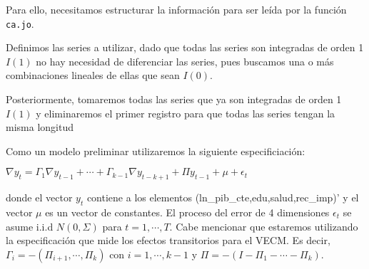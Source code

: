 \documentclass[]{book}
\newenvironment{Shaded}{\begin{snugshade}}{\end{snugshade}}
\newcommand{\KeywordTok}[1]{\textcolor[rgb]{0.13,0.29,0.53}{\textbf{#1}}}
\newcommand{\StringTok}[1]{\textcolor[rgb]{0.31,0.60,0.02}{#1}}
\newcommand{\CommentTok}[1]{\textcolor[rgb]{0.56,0.35,0.01}{\textit{#1}}}
\newcommand{\OperatorTok}[1]{\textcolor[rgb]{0.81,0.36,0.00}{\textbf{#1}}}
\newcommand{\NormalTok}[1]{#1}
\theoremstyle{definition}
\theoremstyle{definition}
\theoremstyle{definition}
\theoremstyle{remark}
\begin{document}
Para ello, necesitamos estructurar la información para ser leída por la
función \texttt{ca.jo}.

Definimos las series a utilizar, dado que todas las series son
integradas de orden 1 \(I(1)\) no hay necesidad de diferenciar las
series, pues buscamos una o más combinaciones lineales de ellas que sean
\(I(0)\).

\begin{Shaded}
\end{Shaded}

Posteriormente, tomaremos todas las series que ya son integradas de
orden 1 \(I(1)\) y eliminaremos el primer registro para que todas las
series tengan la misma longitud

\begin{Shaded}
\end{Shaded}

Como un modelo preliminar utilizaremos la siguiente especificiación:

\(\nabla y_t=\Gamma_1\nabla y_{t-1} + \cdots + \Gamma_{k-1}\nabla y_{t-k+1}+ \Pi y_{t-1} + \mu +\epsilon_t\)

donde el vector \(y_t\) contiene a los elementos
(ln\_pib\_cte,edu,salud,rec\_imp)' y el vector \(\mu\) es un vector de
constantes. El proceso del error de 4 dimensiones \(\epsilon_t\) se
asume i.i.d \(N(0,\Sigma)\) para \(t=1,\cdots,T\). Cabe mencionar que
estaremos utilizando la especificación que mide los efectos transitorios
para el VECM. Es decir, \(\Gamma_i = -(\Pi_{i+1},\cdots,\Pi_k)\) con
\(i=1,\cdots, k-1\) y \(\Pi=-(I-\Pi_1-\cdots-\Pi_k)\).
\end{document}
